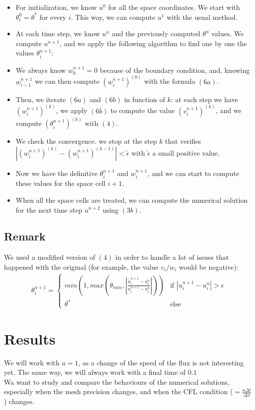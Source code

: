 \documentclass[12pt]{article}
\begin{document}
\begin{itemize}
    \item For initialization, we know $u^0$ for all the space coordinates. We start with $\theta_i^0 = \theta^*$ for every $i$. This way, we can compute $u^1$ with the usual method.
    \item At each time step, we know $u^n$ and the previously computed $\theta^n$ values.
We compute $u^{n+1}$, and we apply the following algorithm to find one by one the values $\theta_i^{n+1}$:
    \item We always know $w_0^{n+1} = 0$ because of the boundary condition, and, knowing $w_{i-1}^{n+1}$ we can then compute $(w_i^{n+1})^{(0)}$ with the formula $(6a)$.
    \item Then, we iterate $(6a)$ and $(6b)$ in function of $k$: at each step we have $(w_i^{n+1})^{(k)}$, we apply $(6b)$ to compute the value $(v_i^{n+1})^{(k)}$, and we compute $(\theta_i^{n+1})^{(k)}$ with $(4)$.
    \item We check the convergence. we stop at the step $k$ that verifies $|(w_i^{n+1})^{(k)} - (w_i^{n+1})^{(k-1)}| < \tilde{\epsilon}$ with $\tilde{\epsilon}$ a small positive value. %
    \item Now we have the definitive $\theta_i^{n+1}$ and $w_i^{n+1}$, and we can start to compute these values for the space cell $i+1$.
    \item When all the space cells are treated, we can compute the numerical solution for the next time step $u^{n+2}$ using $(3b)$.
\end{itemize}

\subsection{Remark}

We used a modified version of $(4)$ in order to handle a lot of issues that happened with the original (for example, the value $v_i/w_i$ would be negative):
\begin{align*}
    \theta_i^{n+1} = \begin{cases}
        min(1,max(\theta_{min},| \frac{\tilde{u}_i^{n+1} - u_i^n}{u_i^{n+1} - u_i^n}| )) & \text{if } |u_i^{n+1} - u_i^n| > \epsilon \tag{4bis} \\
        \theta^* & \text{else} 
    \end{cases}
\end{align*}

\section{Results}
We will work with $a = 1$, as a change of the speed of the flux is not interesting yet. The same way, we will always work with a final time of $0.1$\\
Wa want to study  and compare the behaviours of the numerical solutions, especially when the mesh precision changes, and when the CFL condition ($=\frac{a\Delta t}{\Delta x}$) changes.
\end{document}
